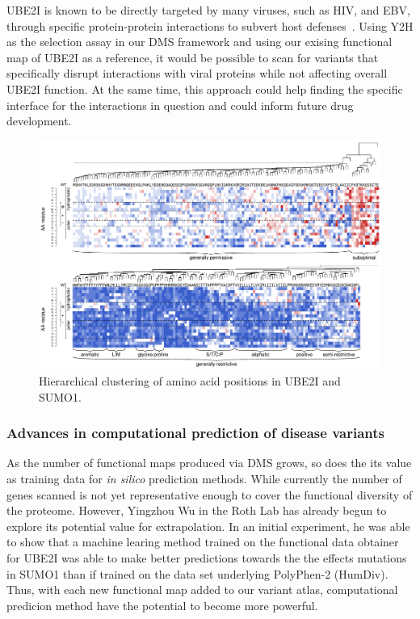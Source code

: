 UBE2I is known to be directly targeted by many viruses, such as HIV, and EBV,  through specific protein-protein interactions to subvert host defenses~\cite{varadaraj_sumo_2014}. Using Y2H as the selection assay in our DMS framework and using our exising functional map of UBE2I as a reference, it would be possible to scan for variants that specifically disrupt interactions with viral proteins while not affecting overall UBE2I function. At the same time, this approach could help finding the specific interface for the interactions in question and could inform future drug development.

\begin{figure}[h!]
	\centering
	\includegraphics[width=\textwidth]{img/clustering.pdf}
	\caption{Hierarchical clustering of amino acid positions in UBE2I and SUMO1.}
	\label{fig:clustering}
\end{figure}

\subsubsection{Advances in computational prediction of disease variants}
As the number of functional maps produced via DMS grows, so does the its value as training data for \textit{in silico} prediction methods. While currently the number of genes scanned is not yet representative enough to cover the functional diversity of the proteome. However, Yingzhou Wu in the Roth Lab has already begun to explore its potential value for extrapolation. In an initial experiment, he was able to show that a machine learing method trained on the functional data obtainer for UBE2I was able to make better predictions towards the the effects mutations in SUMO1 than if trained on the data set underlying PolyPhen-2 (HumDiv). Thus, with each new functional map added to our variant atlas, computational predicion method have the potential to become more powerful.

